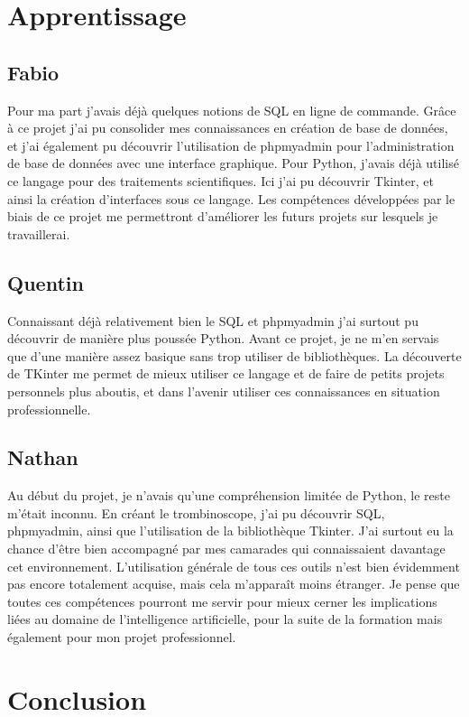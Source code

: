 \documentclass[french]{article}
\begin{document}
    

\section{Apprentissage}
\subsection{Fabio}
    Pour ma part j'avais déjà quelques notions de SQL en ligne de commande. Grâce à ce projet j'ai pu consolider mes connaissances en création de base de données, et j'ai également pu découvrir l'utilisation de phpmyadmin pour l'administration de base de données avec une interface graphique. Pour Python, j'avais déjà utilisé ce langage pour des traitements scientifiques. Ici j'ai pu découvrir Tkinter, et ainsi la création d'interfaces sous ce langage. Les compétences développées par le biais de ce projet me permettront d'améliorer les futurs projets sur lesquels je travaillerai.
\subsection{Quentin}
    Connaissant déjà relativement bien le SQL et phpmyadmin j'ai surtout pu découvrir de manière plus poussée Python. Avant ce projet, je ne m'en servais que d'une manière assez basique sans trop utiliser de bibliothèques. La découverte de TKinter me permet de mieux utiliser ce langage et de faire de petits projets personnels plus aboutis, et dans l'avenir utiliser ces connaissances en situation professionnelle. 
\subsection{Nathan}
    Au début du projet, je n'avais qu'une compréhension limitée de Python, le reste m'était inconnu. En créant le trombinoscope, j'ai pu découvrir SQL, phpmyadmin, ainsi que l'utilisation de la bibliothèque Tkinter. J'ai surtout eu la chance d'être bien accompagné par mes camarades qui connaissaient davantage cet environnement. L'utilisation générale de tous ces outils n'est bien évidemment pas encore totalement acquise, mais cela m'apparaît moins étranger. Je pense que toutes ces compétences pourront me servir pour mieux cerner les implications liées au domaine de l'intelligence artificielle, pour la suite de la formation mais également pour mon projet professionnel. \\
    
\newpage
\section{Conclusion}
\end{document}
